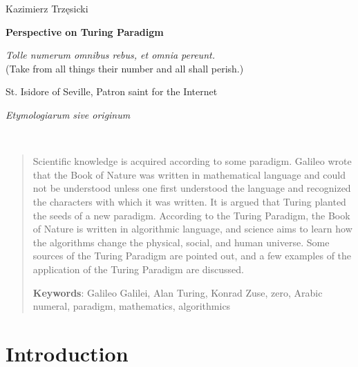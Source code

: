 \documentclass[pdftex,12pt]{article}
\begin{document}


\begin{center}
Kazimierz Trzęsicki

\medskip
\medskip
\textbf{Perspective on Turing Paradigm}
\end{center}
\bigskip



\hfill \begin{minipage} {10cm} \small

\textit{Tolle numerum omnibus rebus, et omnia pereunt.} \\ (Take from all things their number and all shall perish.)


\smallskip

  St. Isidore of Seville, Patron saint for the Internet

  \emph{Etymologiarum sive originum} \parencite*[Liber III, \textit{De mathematica}, IV. \textit{Quid praestent numeri}]{Izydor1911}

 \end{minipage} \\


\bigskip

\begin{abstract}


Scientific knowledge is acquired according to some paradigm. Galileo wrote that the Book of Nature was written in mathematical language and could not be understood unless one first understood the language and recognized the characters with which it was written. It is argued that Turing planted the seeds of a new paradigm. According to the Turing Paradigm, the Book of Nature is written in algorithmic language, and science aims to learn how the algorithms change the physical, social, and human universe. Some sources of the Turing Paradigm are pointed out, and a few examples of the application of the Turing Paradigm are discussed.


\textbf{Keywords}: Galileo Galilei, Alan Turing, Konrad Zuse, zero, Arabic numeral, paradigm, mathematics, algorithmics
\end{abstract}


\section{Introduction}
\end{document}

